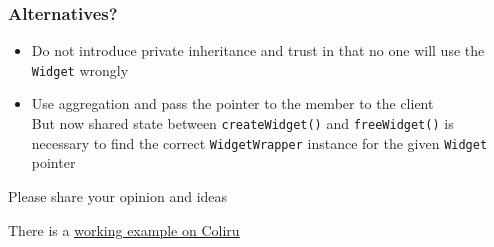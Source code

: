 \documentclass{beamer}
\def\code#1{\texttt{#1}}
\def\link#1#2{\href{#1}{\usebeamercolor[fg]{structure} \underline{#2}}}
\begin{document}

\begin{frame}[fragile]
\frametitle{Alternatives?}
	\begin{itemize}
	\item Do not introduce private inheritance and trust in that no one will use the \code{Widget} wrongly
	\item Use aggregation and pass the pointer to the member to the client\\
	But now shared state between \code{createWidget()} and \code{freeWidget()} is necessary to find the correct \code{WidgetWrapper} instance for the given \code{Widget} pointer
	\end{itemize}
	
	\bigskip
	Please share your opinion and ideas
	
	\bigskip
	There is a \link{http://coliru.stacked-crooked.com/a/e68e29b6461b083e}{working example on Coliru}
\end{frame}

\end{document}
